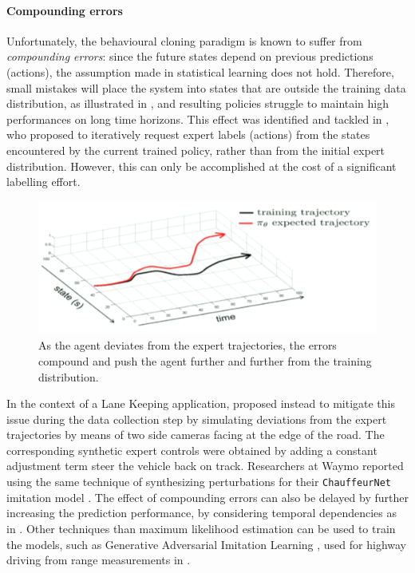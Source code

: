 \paragraph{Compounding errors} Unfortunately, the behavioural cloning paradigm is known to suffer from \emph{compounding errors}: since the future states depend on previous predictions (actions), the \iid assumption made in statistical learning does not hold. Therefore, small mistakes will place the system into states that are outside the training data distribution, as illustrated in , and resulting policies struggle to maintain high performances on long time horizons. This effect was identified and tackled in \citep{Ross2011}, who proposed to iteratively request expert labels (actions) from the states encountered by the current trained policy, rather than from the initial expert distribution. However, this can only be accomplished at the cost of a significant labelling effort. 
\begin{figure}[th]
	\centering
	\includegraphics[width=0.7\linewidth]{img/cp4}
	\caption{As the agent deviates from the expert trajectories, the errors compound and push the agent further and further from the training distribution.}
	\label{fig:compounding}
\end{figure}
In the context of a Lane Keeping application, \citet{Bojarski2016} proposed instead to mitigate this issue during the data collection step by simulating deviations from the expert trajectories by means of two side cameras facing at the edge of the road. The corresponding synthetic expert controls were obtained by adding a constant adjustment term steer the vehicle back on track. Researchers at Waymo reported using the same technique of synthesizing perturbations for their \texttt{ChauffeurNet} imitation model \citep{Bansal2018}. The effect of compounding errors can also be delayed by further increasing the prediction performance, \eg by considering temporal dependencies as in \citep{Eraqi2017,Xu2017}. Other techniques than maximum likelihood estimation can be used to train the models, such as Generative Adversarial Imitation Learning \citep{Ho2016}, used for highway driving from range measurements in \citep{Kuefler2017,Bhattacharyya2018}.

